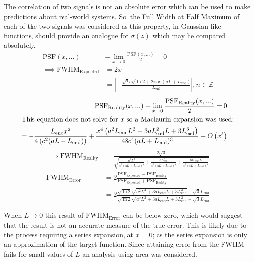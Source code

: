 The correlation of two signals is not an absolute error which can be used to make predictions about real-world systems. So, the Full Width at Half Maximum of each of the two signals was considered as this property, in Gaussian-like functions, should provide an analogue for $\sigma(z)$ which may be compared absolutely.
\begin{align*}
\text{PSF}(x,...) &- \lim_{x\to0} \frac{\text{PSF}(x,...)}{2} = 0 \\
\implies \text{FWHM}_{\text{Expected}} &= 2x \\
&= \left|-\frac{\sqrt{2} c \sqrt{\ln{2} +2 i \pi  n} (a L+L_{\text{end}})}{L_{\text{end}}}\right|,n\in \mathbb{Z}
\end{align*}
\begin{align*}
\text{PSF}_{\text{Reality}}(x,...) - \lim_{x\to0} \frac{\text{PSF}_{\text{Reality}}(x,...)}{2} = 0 \\
\intertext{This equation does not solve for $x$ so a Maclaurin expansion was used:}
= -\frac{L_{\text{end}} x^2}{4 \left(c^2 (a L+L_{\text{end}})\right)}+\frac{x^4 \left(a^2 L_{\text{end}} L^2+3 a L_{\text{end}}^2 L+3 L_{\text{end}}^3\right)}{48 c^4 (a L+L_{\text{end}})^3}+O\left(x^5\right)
\end{align*}
\begin{align*}
\implies \text{FWHM}_{\text{Reality}} &= \frac{2 \sqrt{3}}{\sqrt{\frac{a^2 L^2}{c^2 (a L+L_{\text{end}})^2}+\frac{3 L_{\text{end}}^2}{c^2 (a L+L_{\text{end}})^2}+\frac{3 a L_{\text{end}} L}{c^2 (a L+L_{\text{end}})^2}}}\\
\text{FWHM}_\text{Error} &= 2\frac{\text{PSF}_{\text{Expected}} - \text{PSF}_{\text{Reality}}}{\text{PSF}_{\text{Expected}} + \text{PSF}_{\text{Reality}}}\\
& = 2\frac{\sqrt{\ln{2}} \sqrt{a^2 L^2+3 a L_{\text{end}} L+3 L_{\text{end}}^2}-\sqrt{3} L_{\text{end}}}{\sqrt{\ln{2}} \sqrt{a^2 L^2+3 a L_{\text{end}} L+3 L_{\text{end}}^2}+\sqrt{3} L_{\text{end}}}
\end{align*}

When $L\to0$ this result of $\text{FWHM}_\text{Error}$ can be below zero, which would suggest that the result is not an accurate measure of the true error.
This is likely due to the process requiring a series expansion, at $x=0$; as the series expansion is only an approximation of the target function.
Since attaining error from the FWHM fails for small values of $L$ an analysis using area was considered.

